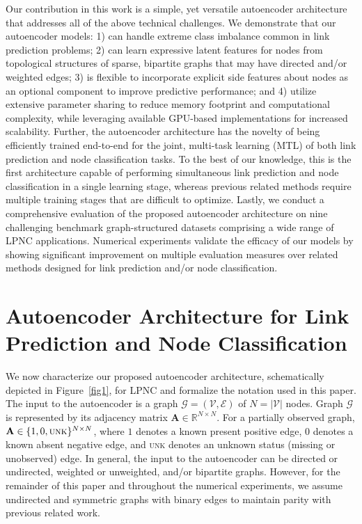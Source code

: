 \documentclass[letterpaper, conference]{IEEEtran}
\begin{document}
Our contribution in this work is a simple, yet versatile autoencoder architecture that addresses all of the above technical challenges. We demonstrate that our autoencoder models: 1) can handle extreme class imbalance common in link prediction problems; 2) can learn expressive latent features for nodes from topological structures of sparse, bipartite graphs that may have directed and/or weighted edges; 3) is flexible to incorporate explicit side features about nodes as an optional component to improve predictive performance; and 4) utilize extensive parameter sharing to reduce memory footprint and computational complexity, while leveraging available GPU-based implementations for increased scalability. Further, the autoencoder architecture has the novelty of being efficiently trained end-to-end for the joint, multi-task learning (MTL) of both link prediction and node classification tasks. To the best of our knowledge, this is the first architecture capable of performing simultaneous link prediction and node classification in a single learning stage, whereas previous related methods require multiple training stages that are difficult to optimize. Lastly, we conduct a comprehensive evaluation of the proposed autoencoder architecture on nine challenging benchmark graph-structured datasets comprising a wide range of LPNC applications. Numerical experiments validate the efficacy of our models by showing significant improvement on multiple evaluation measures over related methods designed for link prediction and/or node classification.

\section{Autoencoder Architecture for Link Prediction and Node Classification}

We now characterize our proposed autoencoder architecture, schematically depicted in Figure~\ref{fig1}, for LPNC and formalize the notation used in this paper. The input to the autoencoder is a graph $\mathcal{G} = (\mathcal{V}, \mathcal{E})$ of $N = |\mathcal{V}|$ nodes. Graph $\mathcal{G}$ is represented by its adjacency matrix $\mathbf{A} \in \mathbb{R}^{N \times N}$. For a partially observed graph, $\mathbf{A} \in \{1,0,\textsc{unk}\}^{N \times N}$, where $1$ denotes a known present positive edge, $0$ denotes a known absent negative edge, and \textsc{unk} denotes an unknown status (missing or unobserved) edge. In general, the input to the autoencoder can be directed or undirected, weighted or unweighted, and/or bipartite graphs. However, for the remainder of this paper and throughout the numerical experiments, we assume undirected and symmetric graphs with binary edges to maintain parity with previous related work.
\end{document}
